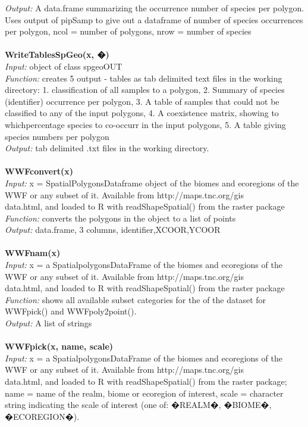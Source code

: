 \documentclass[a4paper,titlepage,11pt]{scrreprt}
\begin{document}
\textit{Output:} A data.frame summarizing the occurrence number of species per polygon.\\
Uses output of pipSamp to give out a dataframe of number of species occurrences per polygon, ncol = number of polygons, nrow = number of species\\
\\
\textbf{WriteTablesSpGeo(x, �)}\\
\textit{Input:} object of class spgeoOUT\\
\textit{Function:} creates 5 output - tables as tab delimited text files in the working directory: 1. classification of all samples to a polygon, 2. Summary of species (identifier) occurrence per polygon, 3. A table of samples that could not be classified to any of the input polygons, 4. A coexistence matrix, showing to whichpercentage species to co-occurr in the input polygons, 5. A table giving species numbers per polygon\\
\textit{Output:} tab delimited .txt files in the working directory.\\
\\
\textbf{WWFconvert(x)}\\
\textit{Input:} x = SpatialPolygonsDataframe object of the biomes and ecoregions of the WWF or any subset of it. Available from http://maps.tnc.org/gis\\data.html, and loaded to R with readShapeSpatial() from the raster package\\
\textit{Function:} converts the polygons in the object to a list of points\\
\textit{Output:} data.frame, 3 columns, identifier,XCOOR,YCOOR\\
\\
\textbf{WWFnam(x)}\\
\textit{Input:} x = a SpatialpolygonsDataFrame of the biomes and ecoregions of the WWF or any subset of it. Available from http://maps.tnc.org/gis\\data.html, and loaded to R with readShapeSpatial() from the raster package\\
\textit{Function:} shows all available subset categories for the of the dataset for WWFpick() and WWFpoly2point().\\
\textit{Output:} A list of strings\\
\\
\textbf{WWFpick(x, name, scale)}\\
\textit{Input:} x = a SpatialpolygonsDataFrame of the biomes and ecoregions of the WWF or any subset of it. Available from http://maps.tnc.org/gis\\data.html, and loaded to R with readShapeSpatial() from the raster package; name = name of the realm, biome or ecoregion of interest, scale = character string indicating the scale of interest (one of: �REALM�, �BIOME�, �ECOREGION�).\\
\end{document}
